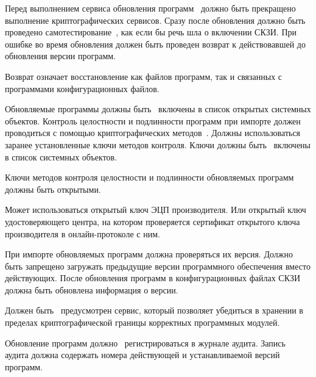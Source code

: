 \label{R.SU.Logic}
Перед выполнением сервиса обновления программ~ 
должно быть прекращено выполнение криптографических сервисов. 
%
Сразу после обновления должно быть проведено 
самотестирование~, 
как если бы речь шла о включении СКЗИ.
%
При ошибке во время обновления должен быть проведен
возврат к действовавшей до обновления версии программ. 

\begin{note}
Возврат означает восстановление как файлов программ, так и связанных с программами 
конфигурационных файлов. 
\end{note}

\label{R.SU.Import}
Обновляемые программы должны быть~ включены в список 
открытых системных объектов. Контроль целостности и подлинности программ
при импорте должен проводиться с помощью криптографических 
методов~. Должны использоваться заранее 
установленные ключи методов контроля. Ключи должны быть~ 
включены в список системных объектов.  

\label{R.SU.Sig}
Ключи методов контроля целостности и подлинности обновляемых программ должны 
быть открытыми. 

\begin{note}
Может использоваться открытый ключ ЭЦП производителя. Или открытый ключ 
удостоверяющего центра, на котором проверяется сертификат открытого ключа 
производителя в онлайн-протоколе с ним. 
\end{note}

\label{R.SU.Version}
При импорте обновляемых программ должна проверяться их версия.
Должно быть запрещено загружать предыдущие версии программного обеспечения 
вместо действующих. После обновления программ в конфигурационных файлах СКЗИ
должна быть обновлена информация о версии.

\label{R.SU.PoS}
Должен быть~ предусмотрен сервис, 
который позволяет убедиться в хранении в пределах криптографической границы
корректных программных модулей.

\label{R.SU.AU}
Обновление программ должно~ регистрироваться в 
журнале аудита. 
%
Запись аудита должна содержать номера действующей и устанавливаемой версий 
программ.

